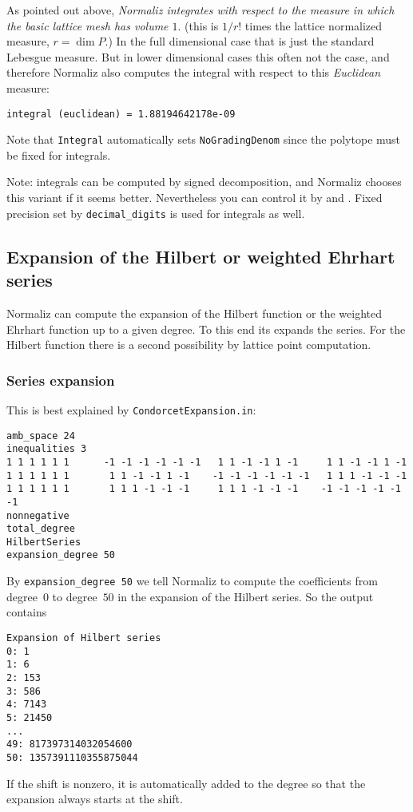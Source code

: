 As pointed out above, \emph{Normaliz integrates with respect to the measure in which the basic lattice mesh has volume $1$}. (this is $1/r!$ times the lattice normalized measure, $r=\dim P$.) In the full dimensional case that is just the standard Lebesgue measure. But in lower dimensional cases this often not the case, and therefore Normaliz also computes the integral with respect to this \emph{Euclidean} measure:
\begin{Verbatim}
integral (euclidean) = 1.88194642178e-09
\end{Verbatim}

Note that \verb|Integral| automatically sets \verb|NoGradingDenom| since the polytope must be fixed for integrals.

Note: integrals can be computed by signed decomposition, and Normaliz chooses this variant if it seems better. Nevertheless you can control it by  and . Fixed precision set by \verb|decimal_digits| is used for integrals as well.

\subsection{Expansion of the Hilbert or weighted Ehrhart series}\label{expansion}

Normaliz can compute the expansion of the Hilbert function or the weighted Ehrhart function up to a given degree. To this end its expands the series. For the Hilbert function there is a second possibility by lattice point computation.

\subsubsection{Series expansion}
This is best explained by \verb|CondorcetExpansion.in|:
\begin{Verbatim}
amb_space 24
inequalities 3
1 1 1 1 1 1      -1 -1 -1 -1 -1 -1   1 1 -1 -1 1 -1     1 1 -1 -1 1 -1
1 1 1 1 1 1       1 1 -1 -1 1 -1    -1 -1 -1 -1 -1 -1   1 1 1 -1 -1 -1
1 1 1 1 1 1       1 1 1 -1 -1 -1     1 1 1 -1 -1 -1    -1 -1 -1 -1 -1 -1
nonnegative
total_degree
HilbertSeries
expansion_degree 50
\end{Verbatim}
By \verb|expansion_degree 50| we tell Normaliz to compute the coefficients from degree~$0$ to degree~$50$ in the expansion of the Hilbert series. So the output contains
\begin{Verbatim}
Expansion of Hilbert series
0: 1
1: 6
2: 153
3: 586
4: 7143
5: 21450
...
49: 817397314032054600
50: 1357391110355875044
\end{Verbatim}
If the shift is nonzero, it is automatically added to the degree so that the expansion always starts at the shift.

